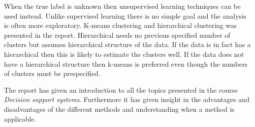 When the true label is unknown then unsupervised learning techniques can be used instead. Unlike supervised learning there is no simple goal and the analysis is often more exploratory. K-means clustering and hierarchical clustering was presented in the report. Hierarchical needs no previous specified number of clusters but assumes hierarchical structure of the data. If the data is in fact has a hierarchical then this is likely to estimate the clusters well. If the data does not have a hierarchical structure then k-means is preferred even though the numbers of clusters must be prespecified. 

The report has given an introduction to all the topics presented in the course \emph{Decision support systems}. Furthermore it has given insight in the advantages and disadvantages of the different methods and understanding when a method is applicable.




